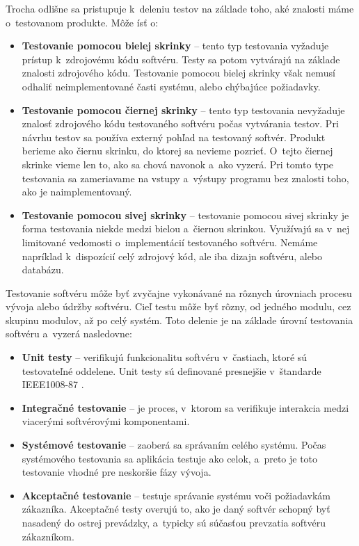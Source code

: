 \noindent Trocha odlišne sa pristupuje k~deleniu testov na základe toho, 
aké znalosti máme o~testovanom produkte. Môže ísť o:
\begin{itemize}
\item \textbf{Testovanie pomocou bielej skrinky} --
tento typ testovania vyžaduje prístup k~zdrojovému kódu softvéru. 
Testy sa potom vytvárajú na základe znalosti zdrojového kódu.
Testovanie pomocou bielej skrinky však nemusí odhaliť neimplementované 
časti systému, alebo chýbajúce požiadavky.

\item \textbf{Testovanie pomocou čiernej skrinky} --
tento typ testovania nevyžaduje znalosť zdrojového kódu testovaného softvéru 
počas vytvárania testov. Pri návrhu testov sa používa externý pohľad na 
testovaný softvér.  Produkt berieme ako čiernu skrinku, do ktorej sa 
nevieme pozrieť. O~tejto čiernej skrinke vieme len to, ako sa chová 
navonok a~ako vyzerá. Pri tomto type testovania sa zameriavame na vstupy 
a~výstupy programu bez znalosti toho, ako je naimplementovaný.

\item \textbf{Testovanie pomocou sivej skrinky} --
testovanie pomocou sivej skrinky je forma testovania niekde medzi bielou
a~čiernou skrinkou. Využívajú sa v~nej limitované vedomosti 
o~implementácií testovaného softvéru. Nemáme napríklad k~dispozícií celý
zdrojový kód, ale iba dizajn softvéru, alebo databázu.
\end{itemize}

\noindent Testovanie softvéru môže byť zvyčajne vykonávané na rôznych úrovniach 
procesu vývoja alebo údržby softvéru. Cieľ testu môže byť rôzny, od jedného
modulu, cez skupinu modulov, až po celý systém.
Toto delenie je na základe úrovní testovania softvéru a~vyzerá nasledovne:
\begin{itemize}
\item \textbf{Unit testy} --
verifikujú funkcionalitu softvéru v~častiach, ktoré sú 
testovateľné oddelene.
Unit testy sú definované presnejšie v~štandarde IEEE1008-87 \cite{Ieee_unit}.

\item \textbf{Integračné testovanie} --
je proces, v~ktorom sa verifikuje interakcia medzi viacerými 
softvérovými komponentami.

\item \textbf{Systémové testovanie} --
zaoberá sa správaním celého systému. Počas systémového testovania sa 
aplikácia testuje ako celok, a~preto je toto testovanie vhodné pre 
neskoršie fázy vývoja.

\item \textbf{Akceptačné testovanie} --
testuje správanie systému voči požiadavkám zákazníka. Akceptačné testy 
overujú to, ako je daný softvér schopný byť nasadený do ostrej prevádzky, 
a~typicky sú súčasťou prevzatia softvéru zákazníkom.
\end{itemize}

